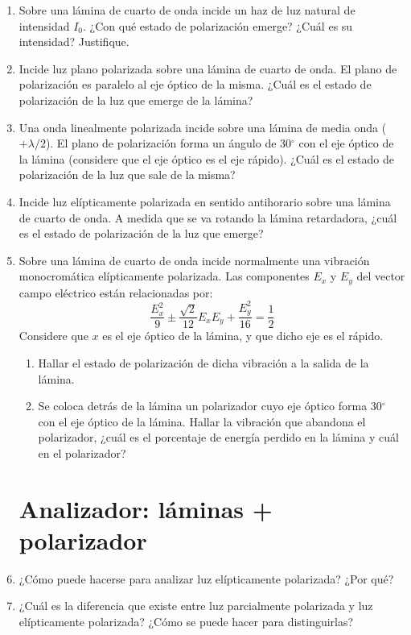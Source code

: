 \documentclass[11pt,spanish,a4paper]{article}
\begin{document}
\begin{enumerate}
\item Sobre una lámina de cuarto de onda incide un haz de luz natural de
intensidad $I_{0}$. ¿Con qué estado de polarización emerge? ¿Cuál
es su intensidad? Justifique.


\item Incide luz plano polarizada sobre una lámina de cuarto de onda. El
plano de polarización es paralelo al eje óptico de la misma. ¿Cuál
es el estado de polarización de la luz que emerge de la lámina?


\item Una onda linealmente polarizada incide sobre una lámina de media onda
($+\lambda/2$). El plano de polarización forma un ángulo de 30$^{\circ}$
con el eje óptico de la lámina (considere que el eje óptico es el
eje rápido). ¿Cuál es el estado de polarización de la luz que sale
de la misma?


\item Incide luz elípticamente polarizada en sentido antihorario sobre una
lámina de cuarto de onda. A medida que se va rotando la lámina retardadora,
¿cuál es el estado de polarización de la luz que emerge?


\item Sobre una lámina de cuarto de onda incide normalmente una vibración
monocromática elípticamente polarizada. Las componentes $E_{x}$ y
$E_{y}$ del vector campo eléctrico están relacionadas por:
\[
\frac{E_{x}^{2}}{9}\pm\frac{\sqrt{2}}{12}E_{x}E_{y}+\frac{E_{y}^{2}}{16}=\frac{1}{2}
\]
Considere que $x$ es el eje óptico de la lámina, y que dicho eje
es el rápido.
\begin{enumerate}
\item Hallar el estado de polarización de dicha vibración a la salida de
la lámina.
\item Se coloca detrás de la lámina un polarizador cuyo eje óptico forma
30$^{\circ}$ con el eje óptico de la lámina. Hallar la vibración
que abandona el polarizador, ¿cuál es el porcentaje de energía perdido
en la lámina y cuál en el polarizador?
\end{enumerate}


\section*{Analizador: láminas + polarizador}

\item ¿Cómo puede hacerse para analizar luz elípticamente polarizada? ¿Por
qué?


\item ¿Cuál es la diferencia que existe entre luz parcialmente polarizada
y luz elípticamente polarizada? ¿Cómo se puede hacer para distinguirlas?



\end{enumerate}
\end{document}
